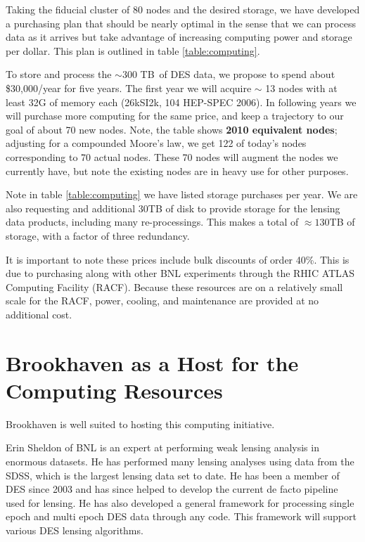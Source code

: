 \documentclass[12pt]{article}
\newcommand{\diskredapprox}{$\sim$300 TB}
\begin{document}
Taking the fiducial cluster of 80 nodes and the desired storage, we have
developed a purchasing plan that should be nearly optimal in the sense that
we can process data as it arrives but take advantage of increasing computing
power and storage per dollar.  This plan is outlined in table \ref{table:computing}.

To store and process the \diskredapprox\ of DES data, we propose to spend about
\$30,000/year for five years. The first year we will acquire $\sim$ 13 nodes
with at least 32G of memory each (26kSI2k, 104 HEP-SPEC 2006).  In following
years we will purchase more computing for the same price, and keep a trajectory
to our goal of about 70 new nodes.  Note, the table shows {\bf 2010 equivalent
nodes}; adjusting for a compounded Moore's law, we get 122 of today's nodes
corresponding to 70 actual nodes.  These 70 nodes will augment the  nodes we
currently have, but note the existing nodes are in heavy use for other
purposes.

Note in table \ref{table:computing} we have listed storage purchases per year.
We are also requesting and additional 30TB of disk to provide storage for the
lensing data products, including many re-processings.  This makes a total of
$\approx 130$TB of storage, with a factor of three redundancy.

It is important to note these prices include bulk discounts of order 40\%.
This is due to purchasing along with other BNL experiments through the RHIC
ATLAS Computing Facility (RACF).  Because these resources are on a relatively
small scale for the RACF, power, cooling, and maintenance are provided at no
additional cost.  


\section{Brookhaven as a Host for the Computing Resources}

Brookhaven is well suited to hosting this computing initiative. 

Erin Sheldon of BNL is an expert at performing weak lensing analysis in
enormous datasets. He has performed many lensing analyses using data from the
SDSS, which is the largest lensing data set to date.   He has been a member of
DES since 2003 and has since helped to develop the current de facto
pipeline used for lensing. He has also developed a general framework for
processing single epoch and multi epoch DES data through any code.  This
framework will support various DES lensing algorithms.
\end{document}
